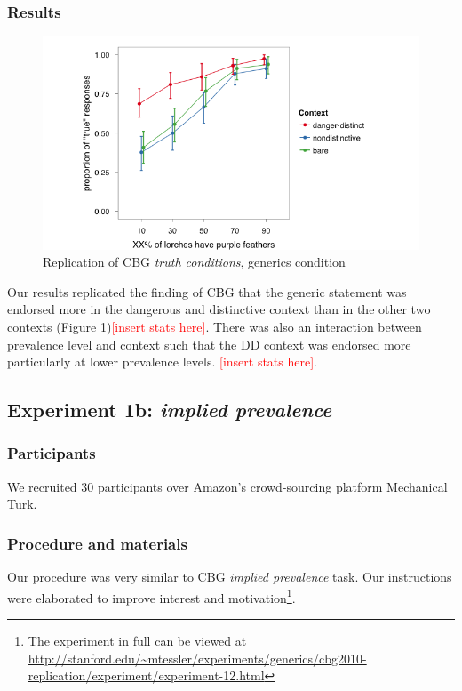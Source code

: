 \documentclass[10pt,letterpaper]{article}
\newcommand{\red}[1]{\textcolor{Red}{#1}}
\begin{document}
\subsubsection{Results}

\begin{figure}
\centering
    \includegraphics[width=\columnwidth]{fig1_replication}
    \caption{Replication of CBG \emph{truth conditions}, generics condition}
  \label{fig:replication}
\end{figure}


Our results replicated the finding of CBG that the generic statement was endorsed more in the dangerous and distinctive context than in the other two contexts (Figure \ref{fig:replication})\red{[insert stats here]}. There was also an interaction between prevalence level and context such that the DD context was endorsed more particularly at lower prevalence levels. \red{[insert stats here]}. 

\subsection{Experiment 1b: \emph{implied prevalence}}

\subsubsection{Participants}

We recruited 30 participants over Amazon's crowd-sourcing platform Mechanical Turk.  

\subsubsection{Procedure and materials}

Our procedure was very similar to CBG \emph{implied prevalence} task. Our instructions were elaborated to improve interest and motivation\footnote{The experiment in full can be viewed at \url{http://stanford.edu/~mtessler/experiments/generics/cbg2010-replication/experiment/experiment-12.html}}. 
\end{document}
